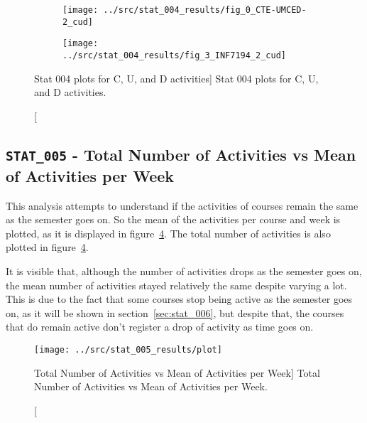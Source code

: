 \begin{figure}[h!]
    \centering

    \begin{subfigure}{.5\textwidth}
        \centering
        \texttt{[image: ../src/stat\_004\_results/fig\_0\_CTE-UMCED-2\_cud]}
        \label{subfig:stat_004_0_cud}
    \end{subfigure}%
    \begin{subfigure}{.5\textwidth}
        \centering
        \texttt{[image: ../src/stat\_004\_results/fig\_3\_INF7194\_2\_cud]}
        \label{subfig:stat_004_3_cud}
    \end{subfigure}

    \caption
        [Stat 004 plots for C, U, and D activities]
        {Stat 004 plots for C, U, and D activities.}

    \label{fig:stat_004_cud}
\end{figure}

\subsection{\texttt{STAT\_005} - Total Number of Activities vs Mean of
Activities per Week}

This analysis attempts to understand if the activities of courses remain the
same as the semester goes on. So the mean of the activities per course and week
is plotted, as it is displayed in figure~\ref{fig:stat_005}. The total number
of activities is also plotted in figure~\ref{fig:stat_005}.

It is visible that, although the number of activities drops as the semester
goes on, the mean number of activities stayed relatively the same despite
varying a lot. This is due to the fact that some courses stop being active as
the semester goes on, as it will be shown in section~\ref{sec:stat_006}, but
despite that, the courses that do remain active don't register a drop of
activity as time goes on.

\begin{figure}[h!]
    \centering

    \texttt{[image: ../src/stat\_005\_results/plot]}

    \caption
        [Total Number of Activities vs Mean of Activities per Week]
        {Total Number of Activities vs Mean of Activities per Week.}

    \label{fig:stat_005}
\end{figure}

